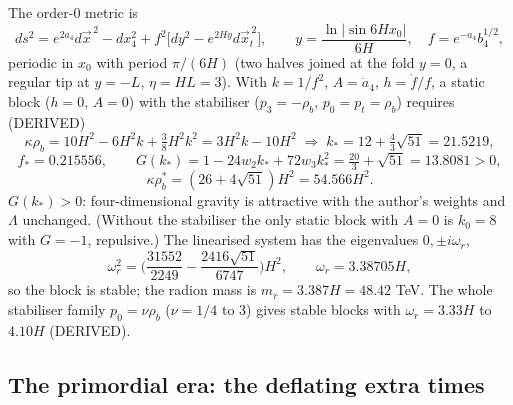 \documentclass[
  10pt,
]{article}
\begin{document}
The order-0 metric is
\[ ds^2 = e^{2a_4}d\vec x^{\,2} - dx_4^2 + f^2\big[dy^2 - e^{2Hy}d\vec x_t^{\,2}\big],\qquad y = \frac{\ln\lvert\sin 6Hx_0\rvert}{6H},\quad f = e^{-a_4}b_4^{1/2},\]
periodic in \(x_0\) with period \(\pi/(6H)\) (two halves joined at the
fold \(y = 0\), a regular tip at \(y = -L\), \(\eta = HL = 3\)). With
\(k = 1/f^2\), \(A = \dot a_4\), \(h = \dot f/f\), a static block
(\(h = 0\), \(A = 0\)) with the stabiliser (\(p_3 = -\rho_b\),
\(p_0 = p_t = \rho_b\)) requires (DERIVED)
\[ \kappa\rho_b = 10H^2 - 6H^2k + \tfrac38H^2k^2 = 3H^2k - 10H^2 \;\Longrightarrow\; k_* = 12 + \tfrac43\sqrt{51} = 21.5219,\]
\[ f_* = 0.215556,\qquad G(k_*) = 1 - 24w_2k_* + 72w_3k_*^2 = \tfrac{20}{3} + \sqrt{51} = 13.8081 > 0,\]
\[ \kappa\rho_b^* = (26 + 4\sqrt{51})H^2 = 54.566H^2 .\] \(G(k_*) > 0\):
four-dimensional gravity is attractive with the author's weights and
\(\Lambda\) unchanged. (Without the stabiliser the only static block
with \(A = 0\) is \(k_0 = 8\) with \(G = -1\), repulsive.) The
linearised system has the eigenvalues \(0, \pm i\omega_r\),
\[ \omega_r^2 = \Big(\frac{31552}{2249} - \frac{2416\sqrt{51}}{6747}\Big)H^2,\qquad \omega_r = 3.38705H,\]
so the block is stable; the radion mass is \(m_r = 3.387H = 48.42\) TeV.
The whole stabiliser family \(p_0 = \nu\rho_b\) (\(\nu = 1/4\) to \(3\))
gives stable blocks with \(\omega_r = 3.33H\) to \(4.10H\) (DERIVED).

\hypertarget{the-primordial-era-the-deflating-extra-times}{%
\subsection{The primordial era: the deflating extra
times}\label{the-primordial-era-the-deflating-extra-times}}
\end{document}
